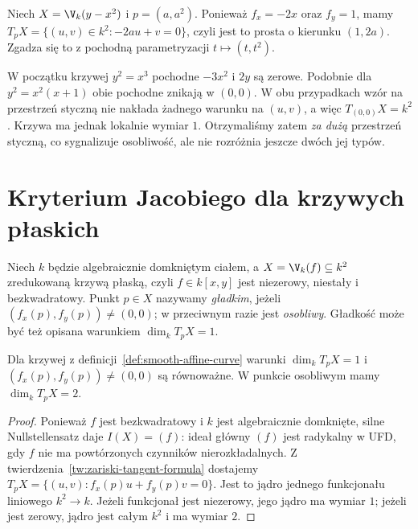 \begin{przyklad}
Niech $X=\V_k(y-x^2)$ i $p=(a,a^2)$.
Ponieważ $f_x=-2x$ oraz $f_y=1$, mamy
$T_pX=\{(u,v)\in k^2:-2au+v=0\}$,
czyli jest to prosta o kierunku $(1,2a)$.
Zgadza się to z pochodną parametryzacji $t\mapsto(t,t^2)$.
\end{przyklad}

\begin{przyklad}
W początku krzywej $y^2=x^3$ pochodne $-3x^2$ i $2y$
są zerowe. Podobnie dla $y^2=x^2(x+1)$
obie pochodne znikają w $(0,0)$. W obu przypadkach
wzór na przestrzeń styczną nie nakłada żadnego warunku
na $(u,v)$, a więc $T_{(0,0)}X=k^2$.
Krzywa ma jednak lokalnie wymiar $1$. Otrzymaliśmy
zatem \emph{za dużą} przestrzeń styczną, co sygnalizuje
osobliwość, ale nie rozróżnia jeszcze dwóch jej typów.
\end{przyklad}

\section{Kryterium Jacobiego dla krzywych płaskich}

\begin{definicja}
\label{def:smooth-affine-curve}
Niech $k$ będzie algebraicznie domkniętym ciałem,
a $X=\V_k(f)\subseteq k^2$ zredukowaną krzywą płaską,
czyli $f\in k[x,y]$ jest niezerowy, niestały i bezkwadratowy.
Punkt $p\in X$ nazywamy \emph{gładkim}, jeżeli
$(f_x(p),f_y(p))\ne(0,0)$; w przeciwnym razie
jest \emph{osobliwy}. Gładkość może być też opisana
warunkiem $\dim_kT_pX=1$.
\end{definicja}

\begin{stwierdzenie}
Dla krzywej z definicji~\ref{def:smooth-affine-curve}
warunki $\dim_k T_pX=1$ i
$(f_x(p),f_y(p))\ne(0,0)$ są równoważne.
W punkcie osobliwym mamy $\dim_kT_pX=2$.
\end{stwierdzenie}
\begin{proof}
Ponieważ $f$ jest bezkwadratowy i $k$ jest algebraicznie
domknięte, silne Nullstellensatz daje $I(X)=(f)$:
ideał główny $(f)$ jest radykalny w UFD, gdy $f$ nie ma
powtórzonych czynników nierozkładalnych.
Z twierdzenia~\ref{tw:zariski-tangent-formula} dostajemy
$T_pX=\{(u,v):f_x(p)u+f_y(p)v=0\}$.
Jest to jądro jednego funkcjonału liniowego $k^2\to k$.
Jeżeli funkcjonał jest niezerowy, jego jądro ma wymiar $1$;
jeżeli jest zerowy, jądro jest całym $k^2$ i ma wymiar $2$.
\end{proof}

